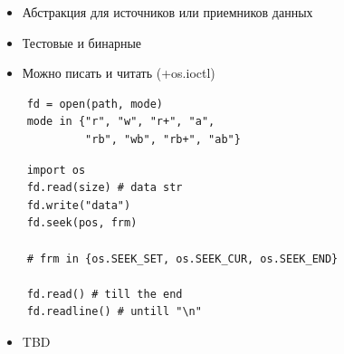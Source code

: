\documentclass{article}
\begin{document}
\begin{itemize}
	\item Абстракция для источников или приемников данных
	\item Тестовые и бинарные
	\item Можно писать и читать (+os.ioctl)
\end{itemize}
\vspace{15pt}
\begin{lstlisting}
    fd = open(path, mode)
    mode in {"r", "w", "r+", "a", 
             "rb", "wb", "rb+", "ab"}
\end{lstlisting}
\newpage

\vspace{15pt}
\begin{lstlisting}
	import os
	fd.read(size) # data str
	fd.write("data")
	fd.seek(pos, frm)
	
	# frm in {os.SEEK_SET, os.SEEK_CUR, os.SEEK_END}
	
	fd.read() # till the end
	fd.readline() # untill "\n"
\end{lstlisting}
\newpage
\begin{itemize}
	\item TBD
\end{itemize}
\newpage

\end{document}
